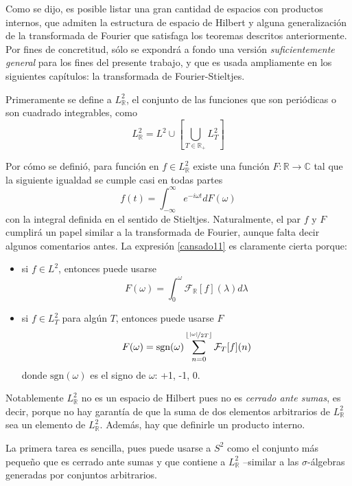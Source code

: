 \documentclass[12pt,letterpaper,draft]{book}
\newcommand{\R}{\mathbb{R}}
\newcommand{\C}{\mathbb{C}}
\newcommand{\intR}{\int_{-\infty}^{\infty}}
\newcommand{\abso}[1]{\left| #1 \right|}
\newcommand{\entero}[1]{\left\lfloor #1 \right\rfloor}
\begin{document}
Como se dijo, es posible listar una gran cantidad de espacios con productos internos, que admiten la estructura de espacio de Hilbert y alguna generalización de la transformada de Fourier que satisfaga los teoremas descritos anteriormente.
%
Por fines de concretitud, sólo se expondrá a fondo una versión \textit{suficientemente general} para los fines del presente trabajo, y que es usada ampliamente en los siguientes capítulos: la transformada de Fourier-Stieltjes.

Primeramente se define a $L^{2}_\R$, el conjunto de las funciones que son periódicas o son cuadrado integrables, como
\begin{equation}
L^{2}_\R = L^{2} \cup \left[ \bigcup_{T\in \R_+} L^{2}_T \right]
\end{equation}

Por cómo se definió, para función en $f \in L^{2}_\R$ existe una función $F: \R \rightarrow \C$ tal que la siguiente igualdad se cumple casi en todas partes
\begin{equation}
f(t) = \intR e^{-i \omega t} dF(\omega)
\label{cansado11}
\end{equation}
con la integral definida en el sentido de Stieltjes.
%
Naturalmente, el par $f$ y $F$ cumplirá un papel similar a la transformada de Fourier, aunque falta decir algunos comentarios antes.
%
La expresión \ref{cansado11} es claramente cierta porque:
\begin{itemize}
\item si $f \in L^{2}$, entonces puede usarse 
\begin{equation*}
F(\omega)=\int_{0}^{\omega} \mathcal{F}_\R[f](\lambda) d\lambda
\end{equation*}
\item si $f \in L^{2}_T$ para algún $T$, entonces puede usarse $F$
\begin{equation*}
F(\omega) =  \text{sgn}(\omega) \sum_{n = 0}^{\entero{\nicefrac{\abso{\omega}}{2T}}} \mathcal{F}_T[f](n)
\end{equation*}
donde $\text{sgn}(\omega)$ es el signo de $\omega$: +1, -1, 0. 
\end{itemize}

Notablemente $L^{2}_\R$ no es un espacio de Hilbert pues no es \textit{cerrado ante sumas}, es decir, porque no hay garantía de que la suma de dos elementos arbitrarios de $L^{2}_\R$ sea un elemento de $L^{2}_\R$.
%
Además, hay que definirle un producto interno.

La primera tarea es sencilla, pues puede usarse a $S^{2}$ como el conjunto más pequeño que es cerrado ante sumas y que contiene a $L^{2}_\R$ --similar a las $\sigma$-álgebras generadas por conjuntos arbitrarios.
\end{document}
